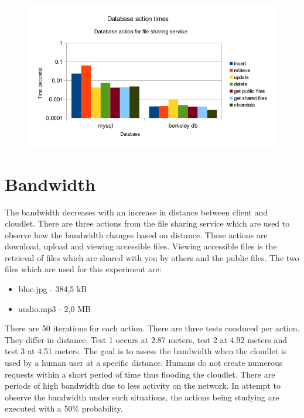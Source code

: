 \begin{figure}
\centering
\includegraphics[scale=0.7]{figures/filesharingdb}
\caption{}
\label{fig:filesharingdb}
\end{figure}

\newpage

\section{Bandwidth}
The bandwidth decreases with an increase in distance between client and cloudlet. There are three actions from the file sharing service which are used to observe how the bandwidth changes based on distance. These actions are download, upload and viewing accessible files. Viewing accessible files is the retrieval of files which are shared with you by others and the public files. The two files which are used for this experiment are:
\begin{itemize}
\item blue.jpg - 384,5 kB
\item audio.mp3 - 2,0 MB
\end{itemize}
There are 50 iterations for each action. There are three tests conduced per action. They differ in distance. Test 1 occurs at 2.87 meters, test 2 at 4.92 meters and test 3 at 4.51 meters. The goal is to assess the bandwidth when the cloudlet is used by a human user at a specific distance. Humans do not create numerous requests within a short period of time thus flooding the cloudlet. There are periods of high bandwidth due to less activity on the network. In attempt to observe the bandwidth under such situations, the actions being studying are executed with a 50\% probability.

